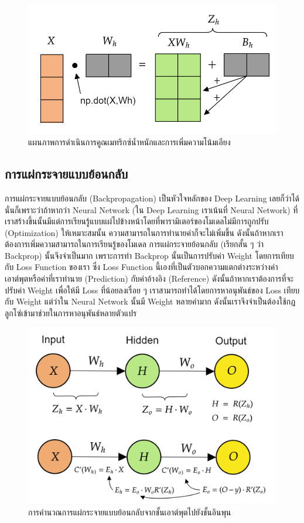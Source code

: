 \begin{figure}[htbp]
    \centering
    \includegraphics[width=0.8\linewidth]{fig/nn_feedforward_matrix_weighted_input.png}
    \caption{แผนภาพการดำเนินการคูณเมทริกซ์น้ำหนักและการเพิ่มความโน้มเอียง}
    \label{fig:nn_ff_mat_w}
\end{figure}

\subsection{การแผ่กระจายแบบย้อนกลับ}
\label{ssec:backprop}

การแผ่กระจายแบบย้อนกลับ (Backpropagation) เป็นหัวใจหลักของ Deep Learning เลยก็ว่าได้ นั่นก็เพราะว่าถ้าหากว่า Neural Network 
(ใน Deep Learning เราเน้นที่ Neural Network) ที่เราสร้างขึ้นนั้นมีแต่การเรียนรู้แบบแผ่ไปข้างหน้าโดยที่พารามิเตอร์ของโมเดลไม่มีการถูกปรับ
(Optimization) ให้เหมาะสมนั้น ความสามารถในการทำนายค่าก็จะไม่เพิ่มขึ้น ดังนั้นถ้าหากเราต้องการเพิ่มความสามารถในการเรียนรู้ของโมเดล 
การแผ่กระจายย้อนกลับ (เรียกสั้น ๆ ว่า Backprop) นั้นจึงจำเป็นมาก เพราะการทำ Backprop นั้นเป็นการปรับค่า Weight โดยการเทียบกับ Loss
Function ของเรา ซึ่ง Loss Function นี้เองที่เป็นตัวบอกความแตกต่างระหว่างค่าเอาต์พุตหรือค่าที่เราทำนาย (Prediction) กับค่าอ้างอิง 
(Reference) ดังนั้นถ้าหากเราต้องการที่จะปรับค่า Weight เพื่อให้มี Loss ที่น้อยลงเรื่อย ๆ เราสามารถทำได้โดยการหาอนุพันธ์ของ Loss 
เทียบกับ Weight แต่ว่าใน Neural Network นั้นมี Weight หลายค่ามาก ดังนั้นเราจึงจำเป็นต้องใช้กฎลูกโซ่เข้ามาช่วยในการหาอนุพันธ์หลายตัวแปร

\begin{figure}[htbp]
    \centering
    \includegraphics[width=0.8\linewidth]{fig/nn_backprop.png}
    \caption{การคำนวณการแผ่กระจายแบบย้อนกลับจากชั้นเอาต์พุตไปยังชั้นอินพุน}
    \label{fig:nn_bp}
\end{figure}

